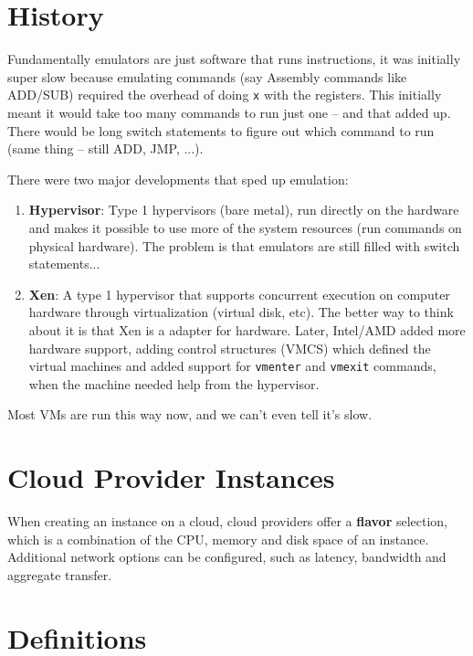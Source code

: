 \documentclass{report}
\newcommand{\npar}{\par\noindent}
\newcommand{\vpar}{\vspace{1em}\npar}
\begin{document}
\section{History}

\par Fundamentally emulators are just software that runs instructions, it was initially super slow because emulating commands (say Assembly commands like ADD/SUB) required the overhead of doing \verb|x| with the registers. This initially meant it would take too many commands to run just one -- and that added up. There would be long switch statements to figure out which command to run (same thing -- still ADD, JMP, ...).

\vpar There were two major developments that sped up emulation:

\begin{enumerate}
    \item \textbf{Hypervisor}: Type 1 hypervisors (bare metal), run directly on the hardware and makes it possible to use more of the system resources (run commands on physical hardware). The problem is that emulators are still filled with switch statements...
    \item \textbf{Xen}: A type 1 hypervisor that supports concurrent execution on computer hardware through virtualization (virtual disk, etc). The better way to think about it is that Xen is a adapter for hardware. Later, Intel/AMD added more hardware support, adding control structures (VMCS) which defined the virtual machines and added support for \verb|vmenter| and \verb|vmexit| commands, when the machine needed help from the hypervisor.
\end{enumerate}

\npar Most VMs are run this way now, and we can't even tell it's slow.

\section{Cloud Provider Instances}

\par When creating an instance on a cloud, cloud providers offer a \textbf{flavor} selection, which is a combination of the CPU, memory and disk space of an instance. Additional network options can be configured, such as latency, bandwidth and aggregate transfer.

\newpage
\section{Definitions}
\end{document}
